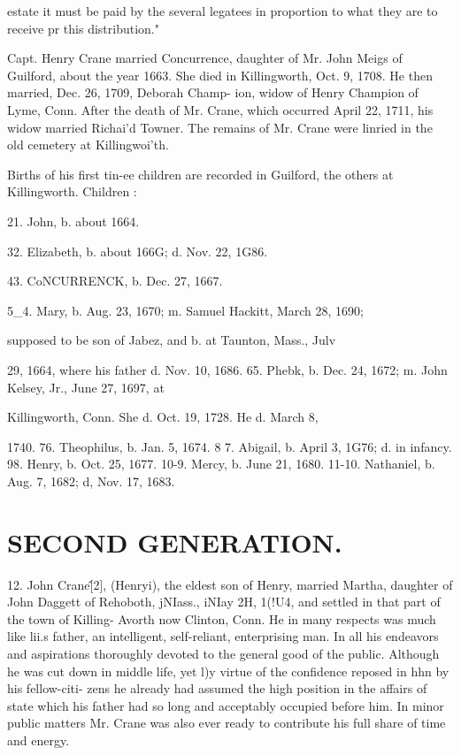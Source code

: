 \documentclass{book}
\begin{document}
estate it must be paid by the several legatees in proportion to what they 
are to receive pr this distribution." 

Capt. Henry Crane married Concurrence, daughter of Mr. John 
Meigs of Guilford, about the year 1663. She died in Killingworth, 
Oct. 9, 1708. He then married, Dec. 26, 1709, Deborah Champ- 
ion, widow of Henry Champion of Lyme, Conn. After the death 
of Mr. Crane, which occurred April 22, 1711, his widow married 
Richai'd Towner. The remains of Mr. Crane were linried in the 
old cemetery at Killingwoi'th. 

Births of his first tin-ee children are recorded in Guilford, the 
others at Killingworth. Children : 

21. John, b. about 1664. 

32. Elizabeth, b. about 166G; d. Nov. 22, 1G86. 

43. CoNCURRENCK, b. Dec. 27, 1667. 

5\_4. Mary, b. Aug. 23, 1670; m. Samuel Hackitt, March 28, 1690; 

supposed to be son of Jabez, and b. at Taunton, Mass., Julv 

29, 1664, where his father d. Nov. 10, 1686. 
65. Phebk, b. Dec. 24, 1672; m. John Kelsey, Jr., June 27, 1697, at 

Killingworth, Conn. She d. Oct. 19, 1728. He d. March 8, 

1740. 
76. Theophilus, b. Jan. 5, 1674. 
8  7. Abigail, b. April 3, 1G76; d. in infancy. 
98. Henry, b. Oct. 25, 1677. 
10-9. Mercy, b. June 21, 1680. 
11-10. Nathaniel, b. Aug. 7, 1682; d, Nov. 17, 1683. 



\section{SECOND GENERATION.}


12. John Crane\^ [2], (Henryi), the eldest son of Henry, 
married Martha, daughter of John Daggett of Rehoboth, jNIass., 
iNIay 2H, 1(!U4, and settled in that part of the town of Killing- 
Avorth now Clinton, Conn. He in many respects was much like 
lii.s father, an intelligent, self-reliant, enterprising man. In all 
his endeavors and aspirations thoroughly devoted to the general 
good of the public. Although he was cut down in middle life, 
yet l)y virtue of the confidence reposed in hhn by his fellow-citi- 
zens he already had assumed the high position in the affairs of 
state which his father had so long and acceptably occupied before 
him. In minor public matters Mr. Crane was also ever ready to 
contribute his full share of time and energy. 
\end{document}
